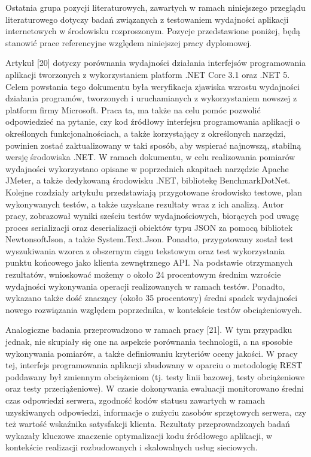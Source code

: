 Ostatnia grupa pozycji literaturowych, zawartych w ramach niniejszego przeglądu literaturowego dotyczy badań związanych z testowaniem wydajności aplikacji internetowych w środowisku rozproszonym. Pozycje przedstawione poniżej, będą stanowić prace referencyjne względem niniejszej pracy dyplomowej.

Artykuł [20] dotyczy porównania wydajności działania interfejsów programowania aplikacji tworzonych z wykorzystaniem platform .NET Core 3.1 oraz .NET 5. Celem powstania tego dokumentu była weryfikacja zjawiska wzrostu wydajności działania programów, tworzonych i uruchamianych z wykorzystaniem nowszej z platform firmy Microsoft. Praca ta, ma także na celu pomóc pozwolić odpowiedzieć na pytanie, czy kod źródłowy interfejsu programowania aplikacji o określonych funkcjonalnościach, a także korzystający z określonych narzędzi, powinien zostać zaktualizowany w taki sposób, aby wspierać najnowszą, stabilną wersję środowiska .NET. W ramach dokumentu, w celu realizowania pomiarów wydajności wykorzystano opisane w poprzednich akapitach narzędzie Apache JMeter, a także dedykowaną środowisku .NET, bibliotekę BenchmarkDotNet. Kolejne rozdziały artykułu przedstawiają przygotowane środowisko testowe, plan wykonywanych testów, a także uzyskane rezultaty wraz z ich analizą. Autor pracy, zobrazował wyniki sześciu testów wydajnościowych, biorących pod uwagę proces serializacji oraz deserializacji obiektów typu JSON za pomocą bibliotek NewtonsoftJson, a także System.Text.Json. Ponadto, przygotowany został test wyszukiwania wzorca z obszernym ciągu tekstowym oraz test wykorzystania punktu końcowego jako klienta zewnętrznego API. Na podstawie otrzymanych rezultatów, wnioskować możemy o około 24 procentowym średnim wzroście wydajności wykonywania operacji realizowanych w ramach testów. Ponadto, wykazano także dość znaczący (około 35 procentowy) średni spadek wydajności nowego rozwiązania względem poprzednika, w kontekście testów obciążeniowych.

Analogiczne badania przeprowadzono w ramach pracy [21]. W tym przypadku jednak, nie skupiały się one na aspekcie porównania technologii, a na sposobie wykonywania pomiarów, a także definiowaniu kryteriów oceny jakości. W pracy tej, interfejs programowania aplikacji zbudowany w oparciu o metodologię REST poddawany był zmiennym obciążeniom (tj. testy linii bazowej, testy obciążeniowe oraz testy przeciążeniowe). W czasie dokonywania ewaluacji monitorowano średni czas odpowiedzi serwera, zgodność kodów statusu zawartych w ramach uzyskiwanych odpowiedzi, informacje o zużyciu zasobów sprzętowych serwera, czy też wartość wskaźnika satysfakcji klienta. Rezultaty przeprowadzonych badań wykazały kluczowe znaczenie optymalizacji kodu źródłowego aplikacji, w kontekście realizacji rozbudowanych i skalowalnych usług sieciowych.
